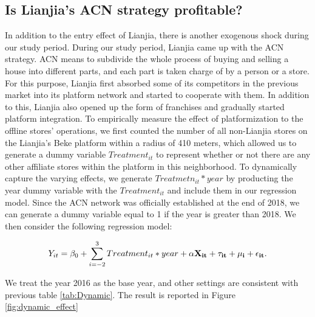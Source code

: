 \documentclass[12pt]{article}
\begin{document}
\subsection{Is Lianjia's ACN strategy profitable?} \label{subsec:acn_strategy}

In addition to the entry effect of Lianjia, there is another exogenous shock during our study period. During our study period, Lianjia came up with the ACN strategy. ACN means to subdivide the whole process of buying and selling a house into different parts, and each part is taken charge of by a person or a store. For this purpose, Lianjia first absorbed some of its competitors in the previous market into its platform network and started to cooperate with them. In addition to this, Lianjia also opened up the form of franchises and gradually started platform integration. To empirically measure the effect of platformization to the offline stores' operations, we first counted the number of all non-Lianjia stores on the Lianjia's Beke platform within a radius of 410 meters, which allowed us to generate a dummy variable $Treatment_{it}$ to represent whether or not there are any other affiliate stores within the platform in this neighborhood. To dynamically capture the varying effects, we generate $Treatmetn_{it} * year$ by producting the year dummy variable with the $Treatment_{it}$ and include them in our regression model. Since the ACN network was officially established at the end of 2018, we can generate a dummy variable equal to 1 if the year is greater than 2018. We then consider the following regression model:

\begin{equation}
    Y_{it}  = \beta_0 + \sum_{i=-2}^3 Treatment_{it} * year + \bf{\alpha} \bf{X}_{it} + \tau_{it} + \mu_i + \epsilon_{it}. \label{eq:acn_assessment}
\end{equation}

We treat the year 2016 as the base year, and other settings are consistent with previous table \ref{tab:Dynamic}. The result is reported in Figure \ref{fig:dynamic_effect}
\end{document}

